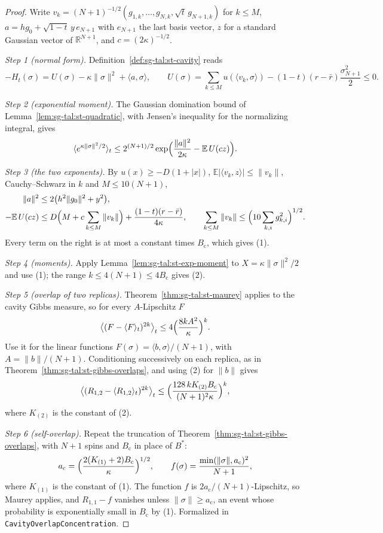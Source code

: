 \begin{proof}
  \leanok
Write $v_k=(N+1)^{-1/2}(g_{1,k},\dots,g_{N,k},\sqrt t\,g_{N+1,k})$ for $k\le M$,
$a=hg_0+\sqrt{1-t}\,y\,e_{N+1}$ with $e_{N+1}$ the last basis vector, $z$ for a standard Gaussian vector of
$\mathbb R^{N+1}$, and $c=(2\kappa)^{-1/2}$.

\emph{Step 1 (normal form).} Definition~\ref{def:sg-tal:st-cavity} reads
\[
-H_t(\sigma)=U(\sigma)-\kappa\|\sigma\|^2+\langle a,\sigma\rangle,\qquad
U(\sigma)=\sum_{k\le M}u(\langle v_k,\sigma\rangle)-(1-t)(r-\bar r)\frac{\sigma_{N+1}^2}2\le0 .
\]

\emph{Step 2 (exponential moment).} The Gaussian domination bound of Lemma~\ref{lem:sg-tal:st-quadratic},
with Jensen's inequality for the normalizing integral, gives
\[
\langle e^{\kappa\|\sigma\|^2/2}\rangle_t\le2^{(N+1)/2}
\exp\Bigl(\frac{\|a\|^2}{2\kappa}-\mathbb E\,U(cz)\Bigr).
\]

\emph{Step 3 (the two exponents).} By $u(x)\ge-D(1+|x|)$, $\mathbb E|\langle v_k,z\rangle|\le\|v_k\|$,
Cauchy--Schwarz in $k$ and $M\le10(N+1)$,
\begin{align*}
\|a\|^2&\le2\bigl(h^2\|g_0\|^2+y^2\bigr),\\
-\mathbb E\,U(cz)&\le D\Bigl(M+c\sum_{k\le M}\|v_k\|\Bigr)+\frac{(1-t)(r-\bar r)}{4\kappa},\qquad
\sum_{k\le M}\|v_k\|\le\Bigl(10\sum_{k,i}g_{k,i}^2\Bigr)^{1/2}.
\end{align*}
Every term on the right is at most a constant times $B_{\mathrm c}$, which gives (1).

\emph{Step 4 (moments).} Apply Lemma~\ref{lem:sg-tal:st-exp-moment} to $X=\kappa\|\sigma\|^2/2$ and use (1);
the range $k\le4(N+1)\le4B_{\mathrm c}$ gives (2).

\emph{Step 5 (overlap of two replicas).} Theorem~\ref{thm:sg-tal:st-maurey} applies to the cavity Gibbs measure,
so for every $A$-Lipschitz $F$
\[
\bigl\langle(F-\langle F\rangle_t)^{2k}\bigr\rangle_t\le4\Bigl(\frac{8kA^2}\kappa\Bigr)^k .
\]
Use it for the linear functions $F(\sigma)=\langle b,\sigma\rangle/(N+1)$, with $A=\|b\|/(N+1)$. Conditioning
successively on each replica, as in Theorem~\ref{thm:sg-tal:st-gibbs-overlaps}, and using (2) for $\|b\|$ gives
\[
\bigl\langle(R_{1,2}-\langle R_{1,2}\rangle_t)^{2k}\bigr\rangle_t
\le\Bigl(\frac{128\,kK_{(2)}B_{\mathrm c}}{(N+1)^2\kappa}\Bigr)^k,
\]
where $K_{(2)}$ is the constant of (2).

\emph{Step 6 (self-overlap).} Repeat the truncation of Theorem~\ref{thm:sg-tal:st-gibbs-overlaps}, with $N+1$
spins and $B_{\mathrm c}$ in place of $B^*$:
\[
a_{\mathrm c}=\Bigl(\frac{2(K_{(1)}+2)B_{\mathrm c}}\kappa\Bigr)^{1/2},\qquad
f(\sigma)=\frac{\min(\|\sigma\|,a_{\mathrm c})^2}{N+1},
\]
where $K_{(1)}$ is the constant of (1). The function $f$ is $2a_{\mathrm c}/(N+1)$-Lipschitz, so Maurey applies,
and $R_{1,1}-f$ vanishes unless $\|\sigma\|\ge a_{\mathrm c}$, an event whose probability is exponentially small
in $B_{\mathrm c}$ by (1).
Formalized in \texttt{CavityOverlapConcentration}.
\end{proof}

